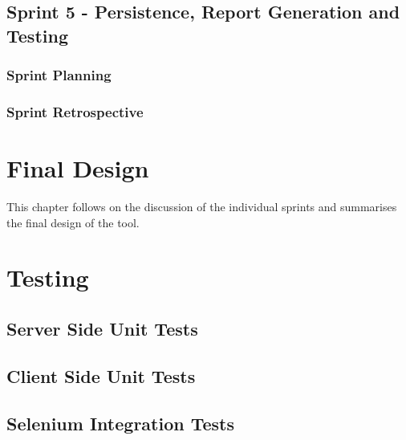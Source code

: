 \section{Sprint 5 - Persistence, Report Generation and Testing}
\subsection{Sprint Planning}

\subsection{Sprint Retrospective}

\chapter{Final Design}

This chapter follows on the discussion of the individual sprints and summarises
the final design of the tool.

\chapter{Testing}

\section{Server Side Unit Tests}
\section{Client Side Unit Tests}
\section{Selenium Integration Tests}

